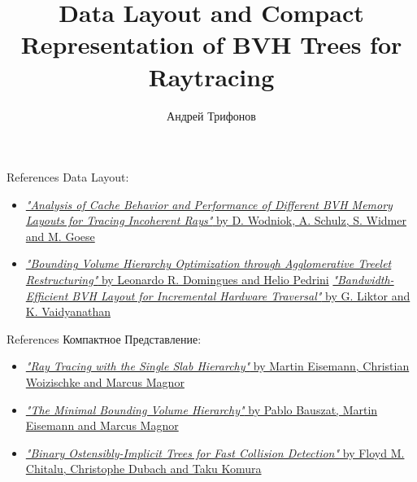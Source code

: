 \documentclass{beamer}
\title{Data Layout and Compact Representation of BVH Trees for Raytracing}
\author{Андрей Трифонов}
\begin{document}
\maketitle

\begin{frame}{References}
    Data Layout:
    \begin{itemize}
        \item
            \href{https://diglib.eg.org/bitstream/handle/10.2312/EGPGV.EGPGV13.057-064/057-064.pdf?sequence=1}
            {\textit{"Analysis of Cache Behavior and Performance of Different BVH Memory
            Layouts for Tracing Incoherent Rays"} by D. Wodniok, A. Schulz, S. Widmer and M. Goese}
        \item
            \href{https://sci-hub.ru/http://dx.doi.org/10.1145/2790060.2790065}
            {\textit{"Bounding Volume Hierarchy Optimization through Agglomerative Treelet Restructuring"}
            by Leonardo R. Domingues and Helio Pedrini}
            \href{https://diglib.eg.org/bitstream/handle/10.2312/hpg20161192/051-061.pdf?sequence=1&isAllowed=y}
            {\textit{"Bandwidth-Efficient BVH Layout for Incremental Hardware Traversal"}
            by G. Liktor and K. Vaidyanathan}
    \end{itemize}
\end{frame}

\begin{frame}{References}
    Компактное Представление:
    \begin{itemize}
        \item
            \href{https://woizischke.com/ray-tracing-single-slab-hierarchy.pdf}
            {\textit{"Ray Tracing with the Single Slab Hierarchy"}
            by Martin Eisemann, Christian Woizischke and Marcus Magnor}
        \item
            \href{https://diglib.eg.org/bitstream/handle/10.2312/PE.VMV.VMV10.227-234/227-234.pdf}
            {\textit{"The Minimal Bounding Volume Hierarchy"}
            by Pablo Bauszat, Martin Eisemann and Marcus Magnor}
        \item
        \href{https://diglib.eg.org:443/handle/10.1111/cgf13948}
            {\textit{"Binary Ostensibly-Implicit Trees for Fast Collision Detection"}
            by Floyd M. Chitalu, Christophe Dubach and Taku Komura}
    \end{itemize}
\end{frame}
\end{document}
